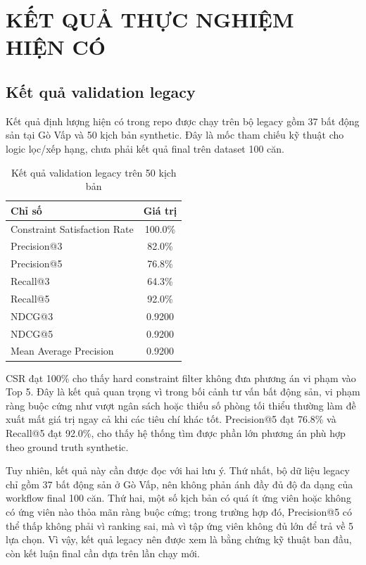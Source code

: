 \documentclass[a4paper,12pt]{article}
\begin{document}
\section{KẾT QUẢ THỰC NGHIỆM HIỆN CÓ}

\subsection{Kết quả validation legacy}
Kết quả định lượng hiện có trong repo được chạy trên bộ legacy gồm 37 bất động sản tại Gò Vấp và 50 kịch bản synthetic. Đây là mốc tham chiếu kỹ thuật cho logic lọc/xếp hạng, chưa phải kết quả final trên dataset 100 căn.

\begin{table}[H]
\centering
\caption{Kết quả validation legacy trên 50 kịch bản}
\label{tab:legacy_results}
\small
\begin{tabular}{|l|c|}
\hline
\textbf{Chỉ số} & \textbf{Giá trị} \\ \hline
Constraint Satisfaction Rate & 100.0\% \\ \hline
Precision@3 & 82.0\% \\ \hline
Precision@5 & 76.8\% \\ \hline
Recall@3 & 64.3\% \\ \hline
Recall@5 & 92.0\% \\ \hline
NDCG@3 & 0.9200 \\ \hline
NDCG@5 & 0.9200 \\ \hline
Mean Average Precision & 0.9200 \\ \hline
\end{tabular}
\end{table}

CSR đạt 100\% cho thấy hard constraint filter không đưa phương án vi phạm vào Top 5. Đây là kết quả quan trọng vì trong bối cảnh tư vấn bất động sản, vi phạm ràng buộc cứng như vượt ngân sách hoặc thiếu số phòng tối thiểu thường làm đề xuất mất giá trị ngay cả khi các tiêu chí khác tốt. Precision@5 đạt 76.8\% và Recall@5 đạt 92.0\%, cho thấy hệ thống tìm được phần lớn phương án phù hợp theo ground truth synthetic.

Tuy nhiên, kết quả này cần được đọc với hai lưu ý. Thứ nhất, bộ dữ liệu legacy chỉ gồm 37 bất động sản ở Gò Vấp, nên không phản ánh đầy đủ độ đa dạng của workflow final 100 căn. Thứ hai, một số kịch bản có quá ít ứng viên hoặc không có ứng viên nào thỏa mãn ràng buộc cứng; trong trường hợp đó, Precision@5 có thể thấp không phải vì ranking sai, mà vì tập ứng viên không đủ lớn để trả về 5 lựa chọn. Vì vậy, kết quả legacy nên được xem là bằng chứng kỹ thuật ban đầu, còn kết luận final cần dựa trên lần chạy mới.
\end{document}
